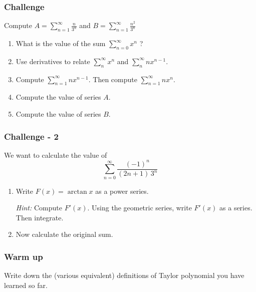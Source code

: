 \begin{frame}[t]
	\frametitle{Challenge}

	Compute \quad $\displaystyle A = \sum_{n=1}^{\infty}\frac{n}{3^{n}}$ \quad and
	\quad $\displaystyle B = \sum_{n=1}^{\infty}\frac{n^{2}}{3^{n}}$

	\hrulefill

	\begin{enumerate}
		\item What is the value of the sum $\displaystyle \sum_{n=0}^{\infty}x^{n}$ ?

		\item Use derivatives to relate $\displaystyle \sum_{n}^{\infty}x^{n}$ and $\displaystyle
			\sum_{n}^{\infty}nx^{n-1}$.

		\item Compute $\displaystyle \sum_{n=1}^{\infty}n x^{n-1}$. \quad Then
			compute $\displaystyle \sum_{n=1}^{\infty}n x^{n}$.

		\item Compute the value of series $A$.

		\item Compute the value of series $B$.
	\end{enumerate}
\end{frame}

\begin{frame}[t]
	\frametitle{Challenge - 2}

	We want to calculate the value of
	\[
		\sum_{n=0}^{\infty}\frac{(-1)^{n}}{(2n+1) \, 3^{n}}
	\]

	\hrulefill

	\begin{enumerate}
		\item Write $\displaystyle F(x) = \arctan x$ as a power series.
			\vspace{.5cm}

			\emph{Hint:} Compute $\displaystyle F'(x)$. Using the geometric series,
			write $\displaystyle F'(x)$ as a series. Then integrate.
			\vspace{.5cm}

		\item Now calculate the original sum.
	\end{enumerate}
\end{frame}

\begin{frame}[t]
	\frametitle{Warm up}

	Write down the (various equivalent) definitions of Taylor polynomial you have
	learned so far.
\end{frame}

